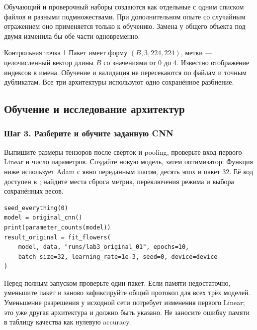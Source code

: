 Обучающий и проверочный наборы создаются как отдельные  с одним списком файлов и разными подмножествами. При дополнительном опыте со случайным отражением оно применяется только к обучению. Замена  у общего объекта под двумя  изменила бы обе части одновременно.

\begin{keybox}{Контрольная точка 1}
Пакет имеет форму \((B,3,224,224)\), метки --- целочисленный вектор длины \(B\) со значениями от 0 до 4. Известно отображение индексов в имена. Обучение и валидация не пересекаются по файлам и точным дубликатам. Все три архитектуры используют одно сохранённое разбиение.
\end{keybox}

\subsection{Обучение и исследование архитектур}
\subsubsection*{Шаг 3. Разберите и обучите заданную CNN}
Выпишите размеры тензоров после свёрток и pooling, проверьте вход первого Linear и число параметров. Создайте новую модель, затем оптимизатор. Функция ниже использует Adam с явно переданным шагом, десять эпох и пакет 32. Её код доступен в ; найдите места сброса метрик, переключения режима и выбора сохранённых весов.
\begin{lstlisting}
seed_everything(0)
model = original_cnn()
print(parameter_counts(model))
result_original = fit_flowers(
    model, data, "runs/lab3_original_01", epochs=10,
    batch_size=32, learning_rate=1e-3, seed=0, device=device
)
\end{lstlisting}

Перед полным запуском проверьте один пакет. Если памяти недостаточно, уменьшите пакет и заново зафиксируйте общий протокол для всех трёх моделей. Уменьшение разрешения у исходной сети потребует изменения первого Linear; это уже другая архитектура и должно быть указано. Не заносите ошибку памяти в таблицу качества как нулевую accuracy.

